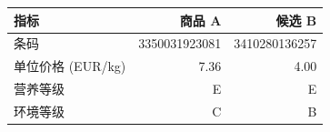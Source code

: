 \begin{tabular}{lrr}
\toprule
指标 & 商品 A & 候选 B \\
\midrule
条码 & 3350031923081 & 3410280136257 \\
单位价格 (EUR/kg) & 7.36 & 4.00 \\
营养等级 & E & E \\
环境等级 & C & B \\
\bottomrule
\end{tabular}
